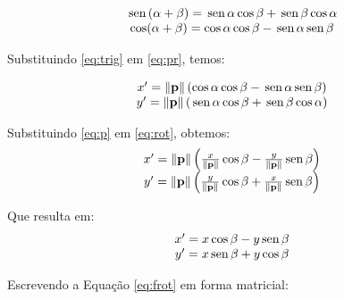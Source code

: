 \documentclass[a4paper,11pt,pagenumber=true]{article}
\newcommand{\vecnorm}[1]{\|\mathbf{#1}\|}
\renewcommand{\sin}{\text{\,sen\,}}
\theoremstyle{mytheor}
\begin{document}
            \begin{equation}
                \begin{matrix}
                    \sin(\alpha+\beta) = \sin\alpha\cos\beta + \sin\beta\cos\alpha \\
                    \cos(\alpha+\beta) = \cos\alpha\cos\beta - \sin\alpha\sin\beta \\
                \end{matrix}
                \label{eq:trig}
            \end{equation}
            
            Substituindo \ref{eq:trig} em \ref{eq:pr}, temos:
            
            \begin{equation}
                \begin{matrix}
                    x' = \vecnorm{p}\left(\cos\alpha\cos\beta - \sin\alpha\sin\beta\right) \\
                    y' = \vecnorm{p}\left(\sin\alpha\cos\beta + \sin\beta\cos\alpha\right) \\
                \end{matrix}
                \label{eq:rot}
            \end{equation}
            
            Substituindo \ref{eq:p} em \ref{eq:rot}, obtemos: 
            \[
                \begin{matrix}
                    x' = \vecnorm{p}\left(\frac{x}{\vecnorm{p}}\cos\beta - \frac{y}{\vecnorm{p}}\sin\beta\right) \\
                    y' = \vecnorm{p}\left(\frac{y}{\vecnorm{p}}\cos\beta + \frac{x}{\vecnorm{p}}\sin\beta\right) \\
                \end{matrix}
            \]

            Que resulta em: 
            \begin{equation}
                \begin{matrix}
                    x' = x\cos\beta - y\sin\beta \\
                    y' = x\sin\beta + y\cos\beta \\
                \end{matrix}
                \label{eq:frot}
            \end{equation}
            
            Escrevendo a Equação \ref{eq:frot} em forma matricial: 
\end{document}
